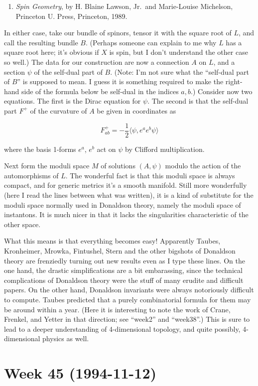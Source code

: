\documentclass{article}
\def\tightlist{}
\begin{document}
\begin{enumerate}
\def\labelenumi{\arabic{enumi})}
\setcounter{enumi}{2}
\tightlist
\item
  \emph{Spin Geometry}, by H. Blaine Lawson, Jr.~and Marie-Louise
  Michelson, Princeton U. Press, Princeton, 1989.
\end{enumerate}

In either case, take our bundle of spinors, tensor it with the square
root of \(L\), and call the resulting bundle \(B\). (Perhaps someone can
explain to me why \(L\) has a square root here; it's obvious if \(X\) is
spin, but I don't understand the other case so well.) The data for our
construction are now a connection \(A\) on \(L\), and a section \(\psi\)
of the self-dual part of \(B\). (Note: I'm not sure what the ``self-dual
part of \(B\)'' is supposed to mean. I guess it is something required to
make the right-hand side of the formula below be self-dual in the
indices \(a,b\).) Consider now two equations. The first is the Dirac
equation for \(\psi\). The second is that the self-dual part \(F^+\) of
the curvature of \(A\) be given in coordinates as

\[F^+_{ab} = -\frac12 \langle\psi, e^a e^b \psi\rangle\]

where the basis 1-forms \(e^a\), \(e^b\) act on \(\psi\) by Clifford
multiplication.

Next form the moduli space \(M\) of solutions \((A, \psi)\) modulo the
action of the automorphisms of \(L\). The wonderful fact is that this
moduli space is always compact, and for generic metrics it's a smooth
manifold. Still more wonderfully (here I read the lines between what was
written), it is a kind of substitute for the moduli space normally used
in Donaldson theory, namely the moduli space of instantons. It is much
nicer in that it lacks the singularities characteristic of the other
space.

What this means is that everything becomes easy! Apparently Taubes,
Kronheimer, Mrowka, Fintushel, Stern and the other bigshots of Donaldson
theory are frenziedly turning out new results even as I type these
lines. On the one hand, the drastic simplifications are a bit
embarassing, since the technical complications of Donaldson theory were
the stuff of many erudite and difficult papers. On the other hand,
Donaldson invariants were always notoriously difficult to compute.
Taubes predicted that a purely combinatorial formula for them may be
around within a year. (Here it is interesting to note the work of Crane,
Frenkel, and Yetter in that direction; see ``week2'' and ``week38''.)
This is sure to lead to a deeper understanding of 4-dimensional
topology, and quite possibly, 4-dimensional physics as well.
\hypertarget{week-45-1994-11-12}{%
\section{Week 45 (1994-11-12)}\label{week-45-1994-11-12}}
\end{document}
